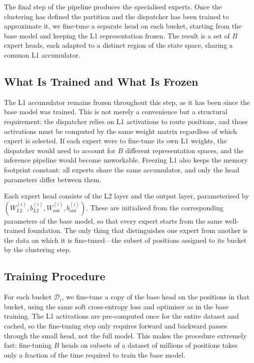 The final step of the pipeline produces the specialised experts. Once the clustering has defined the partition and the dispatcher has been trained to approximate it, we fine-tune a separate head on each bucket, starting from the base model and keeping the L1 representation frozen. The result is a set of $B$ expert heads, each adapted to a distinct region of the state space, sharing a common L1 accumulator.

\subsection{What Is Trained and What Is Frozen}

The L1 accumulator remains frozen throughout this step, as it has been since the base model was trained. This is not merely a convenience but a structural requirement: the dispatcher relies on L1 activations to route positions, and those activations must be computed by the same weight matrix regardless of which expert is selected. If each expert were to fine-tune its own L1 weights, the dispatcher would need to account for $B$ different representation spaces, and the inference pipeline would become unworkable. Freezing L1 also keeps the memory footprint constant: all experts share the same accumulator, and only the head parameters differ between them.

Each expert head consists of the L2 layer and the output layer, parameterised by $(W_{L2}^{(i)},b_{L2}^{(i)},W_{\text{out}}^{(i)},b_{\text{out}}^{(i)})$. These are initialised from the corresponding parameters of the base model, so that every expert starts from the same well-trained foundation. The only thing that distinguishes one expert from another is the data on which it is fine-tuned---the subset of positions assigned to its bucket by the clustering step.


\subsection{Training Procedure}

For each bucket $\mathcal{D}_i$, we fine-tune a copy of the base head on the positions in that bucket, using the same soft cross-entropy loss and optimiser as in the base training. The L1 activations are pre-computed once for the entire dataset and cached, so the fine-tuning step only requires forward and backward passes through the small head, not the full model. This makes the procedure extremely fast: fine-tuning $B$ heads on subsets of a dataset of millions of positions takes only a fraction of the time required to train the base model.


